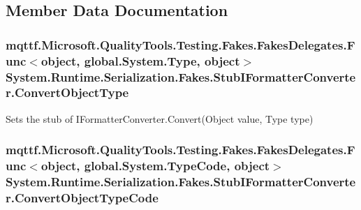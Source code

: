 \subsection{Member Data Documentation}
\hypertarget{class_system_1_1_runtime_1_1_serialization_1_1_fakes_1_1_stub_i_formatter_converter_a721547ee574e402db3b531317308217a}{
\subsubsection[{Convert\-Object\-Type}]{\setlength{\rightskip}{0pt plus 5cm}mqttf.\-Microsoft.\-Quality\-Tools.\-Testing.\-Fakes.\-Fakes\-Delegates.\-Func$<$object, global.\-System.\-Type, object$>$ System.\-Runtime.\-Serialization.\-Fakes.\-Stub\-I\-Formatter\-Converter.\-Convert\-Object\-Type}}\label{class_system_1_1_runtime_1_1_serialization_1_1_fakes_1_1_stub_i_formatter_converter_a721547ee574e402db3b531317308217a}


Sets the stub of I\-Formatter\-Converter.\-Convert(\-Object value, Type type)

\hypertarget{class_system_1_1_runtime_1_1_serialization_1_1_fakes_1_1_stub_i_formatter_converter_ab8ef9c147f4d5e5cd836f1475aed36ba}{
\subsubsection[{Convert\-Object\-Type\-Code}]{\setlength{\rightskip}{0pt plus 5cm}mqttf.\-Microsoft.\-Quality\-Tools.\-Testing.\-Fakes.\-Fakes\-Delegates.\-Func$<$object, global.\-System.\-Type\-Code, object$>$ System.\-Runtime.\-Serialization.\-Fakes.\-Stub\-I\-Formatter\-Converter.\-Convert\-Object\-Type\-Code}}\label{class_system_1_1_runtime_1_1_serialization_1_1_fakes_1_1_stub_i_formatter_converter_ab8ef9c147f4d5e5cd836f1475aed36ba}


